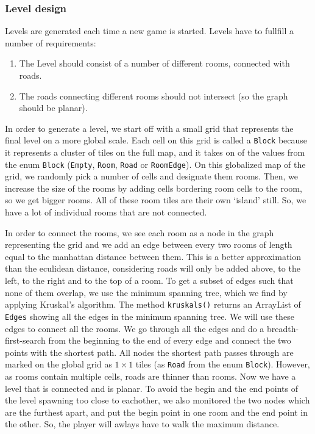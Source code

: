 \documentclass[../main.tex]{subfiles}
\begin{document}
		\subsubsection{Level design}
		Levels are generated each time a new game is started. Levels have to fullfill a number of requirements:
		\begin {enumerate}
			\item {The Level should consist of a number of different rooms, connected with roads}.
			\item {The roads connecting different rooms should not intersect (so the graph should be planar).}
		\end {enumerate}
		In order to generate a level, we start off with a small grid that represents the final level on a more global scale. Each cell on this grid is called a \texttt{Block} because it represents a cluster of tiles on the full map, and it takes on of the values from the enum \texttt{Block} (\texttt{Empty}, \texttt{Room}, \texttt{Road} or \texttt{RoomEdge}). On this globalized map of the grid, we randomly pick a number of cells and designate them rooms. Then, we increase the size of the rooms by adding cells bordering room cells to the room, so we get bigger rooms. All of these room tiles are their own `island' still. So, we have a lot of individual rooms that are not connected. 
		
		In order to connect the rooms, we see each room as a node in the graph representing the grid and we add an edge between every two rooms of length equal to the manhattan distance between them. This is a better approximation than the eculidean distance, considering roads will only be added above, to the left, to the right and to the top of a room. To get a subset of edges such that none of them overlap, we use the minimum spanning tree, which we find by applying Kruskal's algorithm. The method \texttt{kruskals()} returns an ArrayList of \texttt{Edges} showing all the edges in the minimum spanning tree. We will use these edges to connect all the rooms. We go through all the edges and do a breadth-first-search from the beginning to the end of every edge and connect the two points with the shortest path. All nodes the shortest path passes through are marked on the global grid as $1\times1$ tiles (as \texttt{Road} from the enum \texttt{Block}). However, as rooms contain multiple cells, roads are thinner than rooms. Now we have a level that is connected and is planar. To avoid the begin and the end points of the level spawning too close to eachother, we also monitored the two nodes which are the furthest apart, and put the begin point in one room and the end point in the other. So, the player will awlays have to walk the maximum distance. 
		
\end{document}
